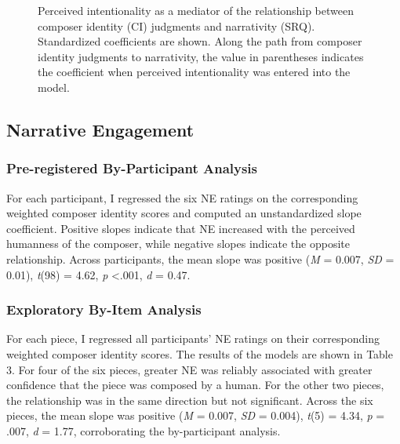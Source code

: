 \documentclass[12pt,twoside]{reedthesis}
\begin{document}
\usetikzlibrary{positioning}

\begin{figure}[h!tbp]
	\centering
{}
  \caption{Perceived intentionality as a mediator of the relationship between composer identity (CI) judgments and narrativity (SRQ). Standardized coefficients are shown. Along the path from composer identity judgments to narrativity, the value in parentheses indicates the coefficient when perceived intentionality was entered into the model.
  }
  \label{fig-intentionality-srq}
\end{figure}


\subsection{Narrative Engagement}
\subsubsection*{Pre-registered By-Participant Analysis}

For each participant, I regressed the six NE ratings on the corresponding weighted composer identity scores and computed an unstandardized slope coefficient. Positive slopes indicate that NE increased with the perceived humanness of the composer, while negative slopes indicate the opposite relationship. Across participants, the mean slope was positive (\emph{M} = 0.007, \emph{SD} = 0.01), \emph{t}(98) = 4.62, \emph{p} \textless .001, \emph{d} = 0.47. 

\subsubsection*{Exploratory By-Item Analysis}

For each piece, I regressed all participants’ NE ratings on their corresponding weighted composer identity scores. The results of the models are shown in Table 3. For four of the six pieces, greater NE was reliably associated with greater confidence that the piece was composed by a human. For the other two pieces, the relationship was in the same direction but not significant. Across the six pieces, the mean slope was positive (\emph{M} = 0.007, \emph{SD} = 0.004), \emph{t}(5) = 4.34, \emph{p} = .007, \emph{d} = 1.77, corroborating the by-participant analysis. 
\end{document}
